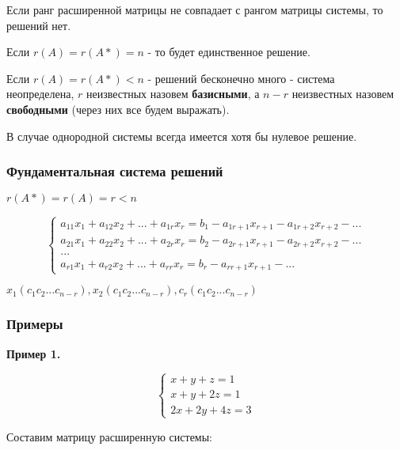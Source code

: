 \documentclass{article}
\begin{document}
\begin{flushleft}
Если ранг расширенной матрицы не совпадает с рангом матрицы системы, то решений нет.

Если $r(A) = r(A*) = n$ - то будет единственное решение.

Если $r(A) = r(A*) < n$ - решений бесконечно много - система неопределена, $r$ неизвестных назовем \textbf{базисными}, а $n - r$ неизвестных назовем \textbf{свободными} (через них все будем выражать).

\hfill

В случае однородной системы всегда имеется хотя бы нулевое решение.

\subsubsection{Фундаментальная система решений}

$r(A*) = r(A) = r < n$

\begin{equation}
    \begin{cases}
        a_{11} x_1 + a_{12} x_2 + ... + a_{1r} x_r = b_1 - a_{1r + 1} x_{r + 1} - a_{1r + 2} x_{r + 2} - ... \\
        a_{21} x_1 + a_{22} x_2 + ... + a_{2r} x_r = b_2 - a_{2r + 1} x_{r + 1} - a_{2r + 2} x_{r + 2} - ... \\
        ... \\
        a_{r1} x_1 + a_{r2} x_2 + ... + a_{r r} x_r = b_r - a_{r r + 1} x_{r + 1} - ...
    \end{cases}
\end{equation}

\hfill

$x_1(c_1 c_2 ... c_{n - r}), x_2(c_1 c_2 ... c_{n - r}), c_r (c_1 c_2 ... c_{n - r})$

\subsubsection{Примеры}

\textbf{Пример 1.}

\begin{equation}
    \begin{cases}
        x + y + z = 1 \\
        x + y + 2z = 1 \\
        2x + 2y + 4z = 3
    \end{cases}
\end{equation}

Составим матрицу расширенную системы:


\end{flushleft}
\end{document}
